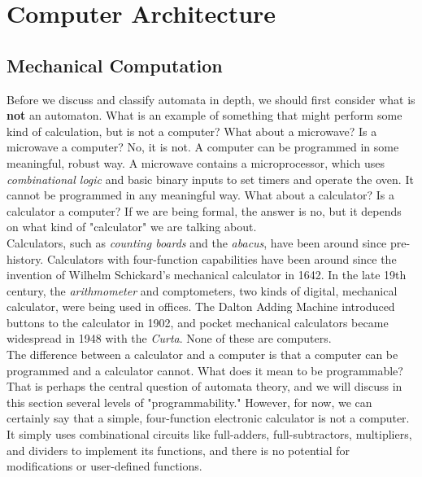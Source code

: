 \chapter{Computer Architecture}

\section{Mechanical Computation}

Before we discuss and classify automata in depth, we should first consider what is \textbf{not} an automaton. What is an example of something that might perform some kind of calculation, but is not a computer? What about a microwave? Is a microwave a computer? No, it is not. A computer can be programmed in some meaningful, robust way. A microwave contains a microprocessor, which uses \textit{combinational logic} and basic binary inputs to set timers and operate the oven. It cannot be programmed in any meaningful way. What about a calculator? Is a calculator a computer? If we are being formal, the answer is no, but it depends on what kind of "calculator" we are talking about. \\

Calculators, such as \textit{counting boards} and the \textit{abacus}, have been around since pre-history. Calculators with four-function capabilities have been around since the invention of Wilhelm Schickard's mechanical calculator in 1642. In the late 19th century, the \textit{arithmometer} and comptometers, two kinds of digital, mechanical calculator, were being used in offices. The Dalton Adding Machine introduced buttons to the calculator in 1902, and pocket mechanical calculators became widespread in 1948 with the \textit{Curta}. None of these are computers. \\

The difference between a calculator and a computer is that a computer can be programmed and a calculator cannot. What does it mean to be programmable? That is perhaps the central question of automata theory, and we will discuss in this section several levels of "programmability." However, for now, we can certainly say that a simple, four-function electronic calculator is not a computer. It simply uses combinational circuits like full-adders, full-subtractors, multipliers, and dividers to implement its functions, and there is no potential for modifications or user-defined functions. \\

